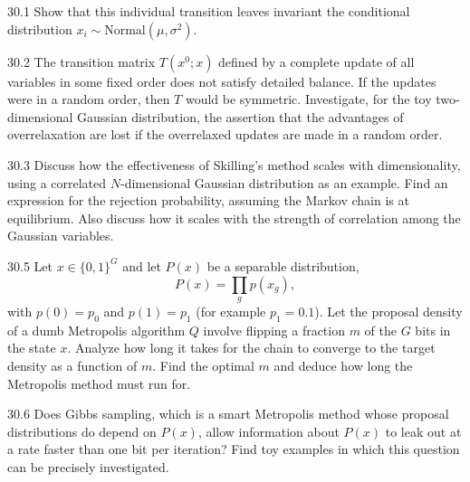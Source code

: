 \documentclass[12pt, a4paper]{article}
\begin{document}
\begin{prob}{30.1}
Show that this individual transition leaves invariant the conditional distribution $x_i \sim \mathrm{Normal}(\mu,\sigma^2)$.
\end{prob}
\begin{sol}
\end{sol}
\bigskip

\begin{prob}{30.2}
The transition matrix $T(x^0;x)$ defined by a complete update of all variables in some fixed order does not satisfy detailed balance. If the updates were in a random order, then $T$ would be symmetric. Investigate, for the toy two-dimensional Gaussian distribution, the assertion that the advantages of overrelaxation are lost if the overrelaxed updates are made in a random order.
\end{prob}
\begin{sol}
\end{sol}
\bigskip

\begin{prob}{30.3}
Discuss how the effectiveness of Skilling’s method scales with dimensionality, using a correlated $N$-dimensional Gaussian distribution as an example. Find an expression for the rejection probability, assuming the Markov chain is at equilibrium. Also discuss how it scales with the strength of correlation among the Gaussian variables.
\end{prob}
\begin{sol}
\end{sol}
\bigskip

\begin{prob}{30.5}
Let $x \in \{0,1\}^G$ and let $P(x)$ be a separable distribution,
\[
P(x) = \prod_g p(x_g),
\]
with $p(0)=p_0$ and $p(1)=p_1$ (for example $p_1=0.1$). Let the proposal density of a dumb Metropolis algorithm $Q$ involve flipping a fraction $m$ of the $G$ bits in the state $x$. Analyze how long it takes for the chain to converge to the target density as a function of $m$. Find the optimal $m$ and deduce how long the Metropolis method must run for.
\end{prob}
\begin{sol}
\end{sol}
\bigskip

\begin{prob}{30.6}
Does Gibbs sampling, which is a smart Metropolis method whose proposal distributions do depend on $P(x)$, allow information about $P(x)$ to leak out at a rate faster than one bit per iteration? Find toy examples in which this question can be precisely investigated.
\end{prob}
\begin{sol}
\end{sol}
\bigskip
\end{document}
